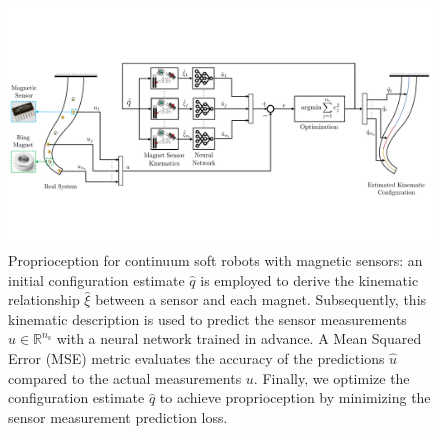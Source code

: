 
\begin{figure}[ht]
  \centering
  \includegraphics[width=1.0\textwidth]{promasens/figures/methodology/methodology_proprioception_v8_compressed.pdf}
  
  \caption{Proprioception for continuum soft robots with magnetic sensors: an initial configuration estimate $\hat{q}$ is employed to derive the kinematic relationship $\hat{\xi}$ between a sensor and each magnet. Subsequently, this kinematic description is used to predict the sensor measurements $\hat{u} \in \mathbb{R}^{n_\mathrm{s}}$ with a neural network trained in advance. A Mean Squared Error (MSE) metric evaluates the accuracy of the predictions $\hat{u}$ compared to the actual measurements $u$. Finally, we optimize the configuration estimate $\hat{q}$ to achieve proprioception by minimizing the sensor measurement prediction loss.}\label{fig:promasens:methodology}
\end{figure}

